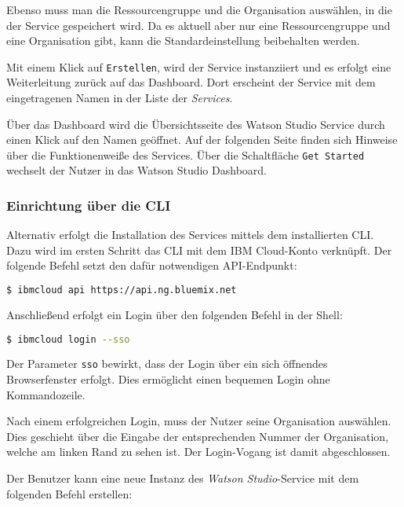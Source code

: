 Ebenso muss man die Ressourcengruppe und die Organisation auswählen, in die der Service gespeichert wird. Da es aktuell
aber nur eine Ressourcengruppe und eine Organisation gibt, kann die Standardeinstellung beibehalten werden.

Mit einem Klick auf \texttt{Erstellen}, wird der Service instanziiert und es erfolgt eine Weiterleitung zurück auf das
Dashboard. Dort erscheint der Service mit dem eingetragenen Namen in der Liste der \textit{Services}.

Über das Dashboard wird die Übersichtsseite des Watson Studio Service durch einen Klick auf den Namen geöffnet. Auf der
folgenden Seite finden sich Hinweise über die Funktionenweiße des Services. Über die Schaltfläche \texttt{Get Started}
wechselt der Nutzer in das Watson Studio Dashboard.

\subsubsection{Einrichtung über die CLI}
Alternativ erfolgt die Installation des Services mittels dem installierten CLI. Dazu wird im ersten Schritt das CLI mit
dem IBM Cloud-Konto verknüpft. Der folgende Befehl setzt den dafür notwendigen API-Endpunkt:

\begin{lstlisting}[language=bash, caption=Setzen des API-Endpunkt, label=ls:vorbereitung_apiendpunkt]
    $ ibmcloud api https://api.ng.bluemix.net
\end{lstlisting}

Anschließend erfolgt ein Login über den folgenden Befehl in der Shell:

\begin{lstlisting}[language=bash, caption=Login über CLI und Single Sign-on, label=ls:vorbereitung_login]
    $ ibmcloud login --sso
\end{lstlisting}

Der Parameter \texttt{sso} bewirkt, dass der Login über ein sich öffnendes Browserfenster erfolgt. Dies ermöglicht einen
bequemen Login ohne Kommandozeile.

Nach einem erfolgreichen Login, muss der Nutzer seine Organisation auswählen. Dies geschieht über die Eingabe der
entsprechenden Nummer der Organisation, welche am linken Rand zu sehen ist. Der Login-Vogang ist damit abgeschlossen.

Der Benutzer kann eine neue Instanz des \textit{Watson Studio}-Service mit dem folgenden Befehl erstellen:

